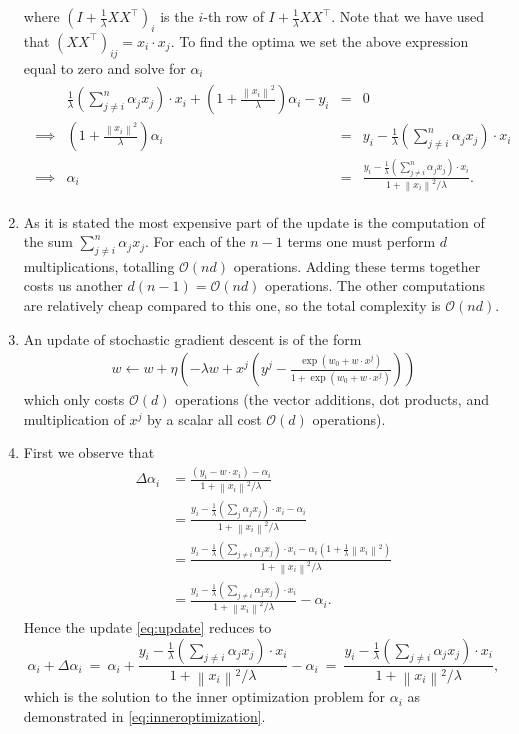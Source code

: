 \documentclass{article}
\newcommand{\norm}[1]{\left\|#1\right\|}
\begin{document}
\begin{enumerate}
	where $(I+\tfrac1\lambda XX^\top)_i$ is the $i$-th row of $I+\tfrac1\lambda XX^\top$. Note that we have used that $(XX^\top)_{ij} = x_i\cdot x_j$. To find the optima we set the above expression equal to zero and solve for $\alpha_i$
	\begin{align}\label{eq:inneroptimization}
		\begin{array}{crcl}
			 &\tfrac1\lambda\left(\sum_{j\neq i}^n \alpha_jx_j\right)\cdot x_i + \left(1+\frac{\norm{x_i}^2}{\lambda} \right)\alpha_i-y_i & = & 0\\
			\implies & \left(1+\frac{\norm{x_i}^2}{\lambda} \right)\alpha_i & = & y_i - \tfrac1\lambda\left(\sum_{j\neq i}^n \alpha_jx_j\right)\cdot x_i \\
			\implies & \alpha_i & = & \frac{y_i - \tfrac1\lambda\left(\sum_{j\neq i}^n \alpha_jx_j\right)\cdot x_i}{1+\norm{x_i}^2/\lambda}.
		\end{array}
	\end{align}
	\item As it is stated the most expensive part of the update is the computation of the sum $\sum_{j\neq i}^n \alpha_jx_j$. For each of the $n-1$ terms one must perform $d$ multiplications, totalling $\mathcal{O}(nd)$ operations. Adding these terms together costs us another $d(n-1)=\mathcal{O}(nd)$ operations. The other computations are relatively cheap compared to this one, so the total complexity is $\mathcal{O}(nd)$.
	\item An update of stochastic gradient descent is of the form
	\begin{align}
		w\leftarrow w + \eta\left(-\lambda w + x^j\left(y^j-\frac{\exp(w_0+w\cdot x^j)}{1+\exp(w_0+w\cdot x^j)} \right)\right)
	\end{align}
	which only costs $\mathcal{O}(d)$ operations (the vector additions, dot products, and multiplication of $x^j$ by a scalar all cost $\mathcal{O}(d)$ operations).

	\item First we observe that
	\begin{align}
		\Delta \alpha_i&=\frac{(y_i-w\cdot x_i)-\alpha_i}{1+\norm{x_i}^2/\lambda}\\
		&=\frac{y_i-\tfrac1\lambda \left(\sum_{j}\alpha_jx_j\right)\cdot x_i-\alpha_i}{1+\norm{x_i}^2/\lambda}\\
		&=\frac{y_i-\tfrac1\lambda \left(\sum_{j\neq i}\alpha_jx_j\right)\cdot x_i-\alpha_i\left(1+\tfrac1\lambda \norm{x_i}^2\right)}{1+\norm{x_i}^2/\lambda}\\
		&= \frac{y_i-\tfrac1\lambda \left(\sum_{j\neq i}\alpha_jx_j\right)\cdot x_i}{1+\norm{x_i}^2/\lambda}-\alpha_i.
	\end{align}
	Hence the update \eqref{eq:update} reduces to
	\begin{equation}
		\alpha_i+\Delta\alpha_i ~=~ \alpha_i + \frac{y_i-\tfrac1\lambda \left(\sum_{j\neq i}\alpha_jx_j\right)\cdot x_i}{1+\norm{x_i}^2/\lambda}-\alpha_i ~=~ \frac{y_i-\tfrac1\lambda \left(\sum_{j\neq i}\alpha_jx_j\right)\cdot x_i}{1+\norm{x_i}^2/\lambda},
	\end{equation}
	which is the solution to the inner optimization problem for $\alpha_i$ as demonstrated in \eqref{eq:inneroptimization}.


\end{enumerate}
\end{document}
